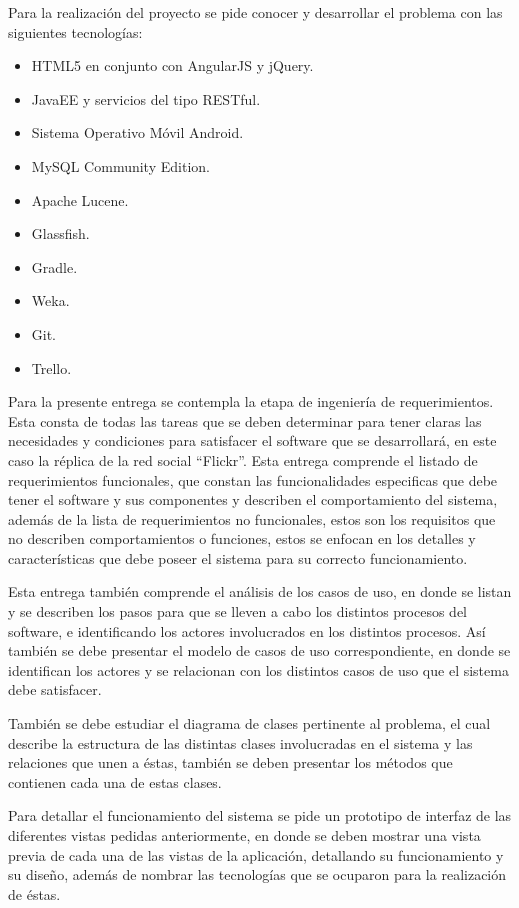 \documentclass{memoria}
\begin{document}
Para la realización del proyecto se pide conocer y desarrollar el problema con las siguientes tecnologías:

\begin{itemize}
    \item HTML5 en conjunto con AngularJS y jQuery.
    \item JavaEE y servicios del tipo RESTful.
    \item Sistema Operativo Móvil Android.
    \item MySQL Community Edition.
    \item Apache Lucene.
    \item Glassfish.
    \item Gradle.
    \item Weka.
    \item Git.
    \item Trello.
\end{itemize}

Para la presente entrega se contempla la etapa de ingeniería de requerimientos. Esta consta de todas las tareas que se deben determinar para tener claras las necesidades y condiciones para satisfacer el software que se desarrollará, en este caso la réplica de la red social “Flickr”. Esta entrega comprende el listado de requerimientos funcionales, que constan las funcionalidades especificas que debe tener el software y sus componentes y describen el comportamiento del sistema, además de la lista de requerimientos no funcionales, estos son los requisitos que no describen comportamientos o funciones, estos se enfocan en los detalles y características que debe poseer el sistema para su correcto funcionamiento.

Esta entrega también comprende el análisis de los casos de uso, en donde se listan y se describen los pasos para que se lleven a cabo los distintos procesos del software, e identificando los actores involucrados en los distintos procesos. Así también se debe presentar el modelo de casos de uso correspondiente, en donde se identifican los actores y se relacionan con los distintos casos de uso que el sistema debe satisfacer.

También se debe estudiar el diagrama de clases pertinente al problema, el cual describe la estructura de las distintas clases involucradas en el sistema y las relaciones que unen a éstas, también se deben presentar los métodos que contienen cada una de estas clases.

Para detallar el funcionamiento del sistema se pide un prototipo de interfaz de las diferentes vistas pedidas anteriormente, en donde se deben mostrar una vista previa de cada una de las vistas de la aplicación, detallando su funcionamiento y su diseño, además de nombrar las tecnologías que se ocuparon para la realización de éstas.
\end{document}
